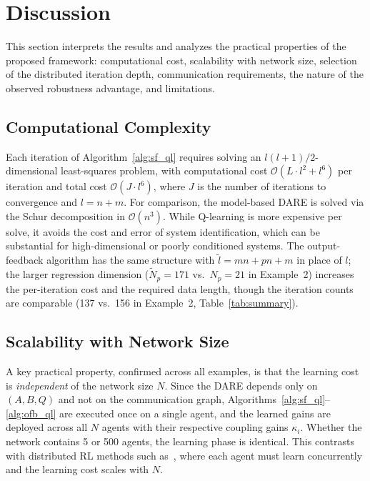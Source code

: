 \documentclass[12pt]{elsarticle}
\theoremstyle{remark}
\begin{document}
\section{Discussion}
\label{sec:discussion}
This section interprets the results and analyzes the practical properties of the proposed framework: computational cost, scalability with network size, selection of the distributed iteration depth, communication requirements, the nature of the observed robustness advantage, and limitations.
\subsection{Computational Complexity}
\label{subsec:complexity}
Each iteration of Algorithm~\ref{alg:sf_ql} requires solving an $l(l+1)/2$-dimensional least-squares problem, with computational cost $\mathcal{O}(L \cdot l^2 + l^6)$ per iteration and total cost $\mathcal{O}(J \cdot l^6)$, where $J$ is the number of iterations to convergence and $l = n+m$. For comparison, the model-based DARE is solved via the Schur decomposition in $\mathcal{O}(n^3)$. While Q-learning is more expensive per solve, it avoids the cost and error of system identification, which can be substantial for high-dimensional or poorly conditioned systems. The output-feedback algorithm has the same structure with $\tilde{l} = mn+pn+m$ in place of $l$; the larger regression dimension ($\tilde{N}_p = 171$ vs.\ $N_p = 21$ in Example~2) increases the per-iteration cost and the required data length, though the iteration counts are comparable (137 vs.\ 156 in Example~2, Table~\ref{tab:summary}).
\subsection{Scalability with Network Size}
\label{subsec:scalability}
A key practical property, confirmed across all examples, is that the learning cost is \emph{independent} of the network size $N$. Since the DARE depends only on $(A,B,Q)$ and not on the communication graph, Algorithms~\ref{alg:sf_ql}--\ref{alg:ofb_ql} are executed once on a single agent, and the learned gains are deployed across all $N$ agents with their respective coupling gains $\kappa_i$. Whether the network contains 5 or 500 agents, the learning phase is identical. This contrasts with distributed RL methods such as~\cite{zhang2011}, where each agent must learn concurrently and the learning cost scales with $N$.
\end{document}
